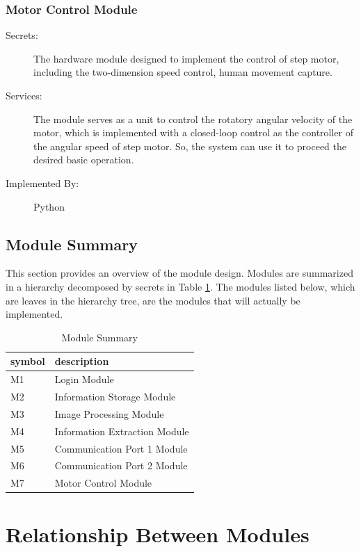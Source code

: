 \documentclass[12pt, titlepage]{article}
\begin{document}
\subsubsection{Motor Control Module}
\begin{description}
\item[Secrets:]The hardware module designed to implement the control of step motor, including the two-dimension speed control, human movement capture.
\item[Services:]The module serves as a unit to control the rotatory angular velocity of the motor, which is implemented with a closed-loop control as the controller of the angular speed of step motor. So, the system can use it to proceed the desired basic operation.
\item[Implemented By:] Python
\end{description}


\subsection{Module Summary}
This section provides an overview of the module design. Modules are summarized
in a hierarchy decomposed by secrets in Table \ref{TableMS}. The modules listed
below, which are leaves in the hierarchy tree, are the modules that will
actually be implemented.
\begin{table}[H]
\begin{tabularx}{\textwidth}{XX}
  \toprule		
  \textbf{symbol} & \textbf{description}\\
  \midrule 
  M1 & Login Module \\
  M2 & Information Storage Module \\
  M3 & Image Processing Module \\
  M4 & Information Extraction Module \\
  M5 & Communication Port 1 Module \\
  M6 & Communication Port 2 Module \\
  M7 & Motor Control Module \\
  \bottomrule
\end{tabularx}
\caption{Module Summary}
\label{TableMS}
\end{table}

\section{Relationship Between Modules} 
\end{document}
